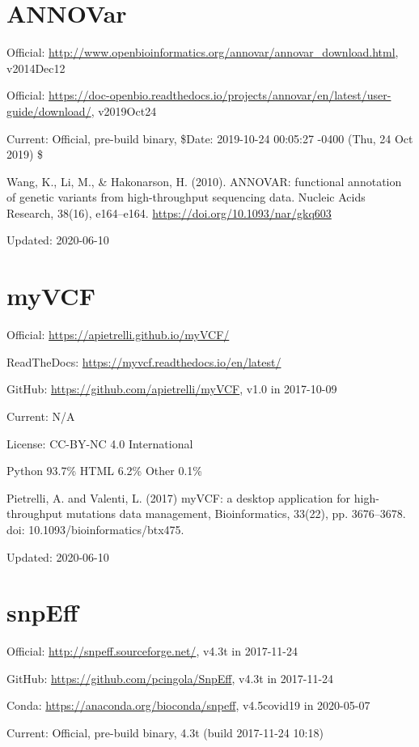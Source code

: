 \documentclass[]{article}
\begin{document}
\section{ANNOVar}

Official: \url{http://www.openbioinformatics.org/annovar/annovar_download.html}, v2014Dec12

Official: \url{https://doc-openbio.readthedocs.io/projects/annovar/en/latest/user-guide/download/}, v2019Oct24

Current: Official, pre-build binary, \$Date: 2019-10-24 00:05:27 -0400 (Thu, 24 Oct 2019) \$

Wang, K., Li, M., \& Hakonarson, H. (2010). ANNOVAR: functional annotation of genetic variants from high-throughput sequencing data. Nucleic Acids Research, 38(16), e164–e164. \url{https://doi.org/10.1093/nar/gkq603}


Updated: 2020-06-10

\section{myVCF}

Official: \url{https://apietrelli.github.io/myVCF/}

ReadTheDocs: \url{https://myvcf.readthedocs.io/en/latest/}

GitHub: \url{https://github.com/apietrelli/myVCF}, v1.0 in 2017-10-09

Current: N/A

License: CC-BY-NC 4.0 International

Python 93.7\% HTML 6.2\% Other 0.1\%

Pietrelli, A. and Valenti, L. (2017) myVCF: a desktop application for high-throughput mutations data management, Bioinformatics, 33(22), pp. 3676–3678. doi: 10.1093/bioinformatics/btx475.

Updated: 2020-06-10
\section{snpEff}

Official: \url{http://snpeff.sourceforge.net/}, v4.3t in 2017-11-24

GitHub: \url{https://github.com/pcingola/SnpEff}, v4.3t in 2017-11-24

Conda: \url{https://anaconda.org/bioconda/snpeff}, v4.5covid19 in 2020-05-07

Current: Official, pre-build binary, 4.3t (build 2017-11-24 10:18)
\end{document}
